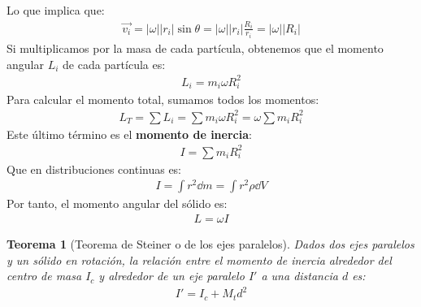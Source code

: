 \documentclass{article}
\newtheorem{teorema}{Teorema}
\begin{document}
Lo que implica que:
\begin{equation}
    \begin{split}
        \vec{v_{i}}= |\omega| |r_{i}| \sin \theta = |\omega| |r_{i}|\frac{R_{i}}{r_{i}} = |\omega | |R_{i}|
    \end{split}
\end{equation}
Si multiplicamos por la masa de cada partícula, obtenemos que el momento angular $L_{i}$ de
cada partícula es:
\begin{equation}
    \begin{split}
        L_{i} = m_{i} \omega R_{i}^{2}
    \end{split}
\end{equation}
Para calcular el momento total, sumamos todos los momentos:
\begin{equation}
    \begin{split}
        L_{T}= \sum L_{i} = \sum m_{i} \omega R_{i}^{2} = \omega \sum m_{i} R_{i}^{2}
    \end{split}
\end{equation}
Este último término es el \textbf{momento de inercia}:
\begin{equation}
    \begin{split}
        I = \sum m_{i}R_{i}^{2}
    \end{split}
\end{equation}
Que en distribuciones continuas es:
\begin{equation}
    \begin{split}
        I = \int r^2 \dd{m}= \int r^{2} \rho  \dd{V}
    \end{split}
\end{equation}
Por tanto, el momento angular del sólido es:
\begin{equation}
    \begin{split}
        L = \omega I
    \end{split}
\end{equation}
\begin{teorema}[Teorema de Steiner o de los ejes paralelos]
    Dados dos ejes paralelos y un sólido en rotación, la relación entre el momento de inercia
    alrededor del centro de masa $I_{c}$ y alrededor de un eje paralelo $I'$ a una distancia $d$
    es:
    \begin{equation}
        \begin{split}
            I' = I_{c} + M_{t}d^{2}
        \end{split}
    \end{equation}
\end{teorema}
\end{document}
